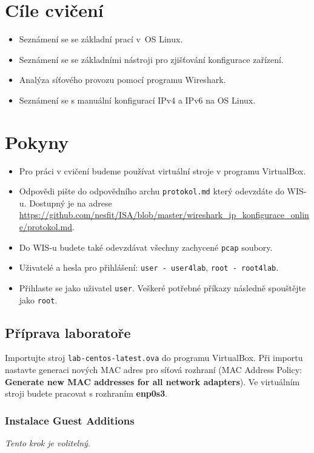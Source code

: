 \section*{Cíle cvičení}
\begin{itemize}
	\item Seznámení se se základní prací v~OS Linux.
	\item Seznámení se se základními nástroji pro zjišťování konfigurace zařízení.
	\item Analýza síťového provozu pomocí programu Wireshark.
	\item Seznámení se s manuální konfigurací IPv4 a IPv6 na OS Linux.
\end{itemize}

\section*{Pokyny}
\begin{itemize}
\item Pro práci v cvičení budeme používat virtuální stroje v programu VirtualBox.
\item Odpovědi pište do odpovědního archu \texttt{protokol.md} který odevzdáte do WIS-u. Dostupný je na adrese \url{https://github.com/nesfit/ISA/blob/master/wireshark_ip_konfigurace_online/protokol.md}.
\item Do WIS-u budete také odevzdávat všechny zachycené \texttt{pcap} soubory.
\item Uživatelé a hesla pro přihlášení: \texttt{user - user4lab}, \texttt{root - root4lab}.
\item Přihlaste se jako uživatel \texttt{user}. Veškeré potřebné příkazy následně spouštějte jako \texttt{root}.
\end{itemize}

\subsection*{Příprava laboratoře}
Importujte stroj \texttt{lab-centos-latest.ova} do programu VirtualBox.
Při importu nastavte generaci nových MAC adres pro síťová rozhraní (MAC Address Policy: \textbf{Generate new MAC addresses for all network adapters}).
Ve virtuálním stroji budete pracovat s rozhraním {\bf enp0s3}.

\subsubsection*{Instalace Guest Additions}
\textit{Tento krok je volitelný}.

